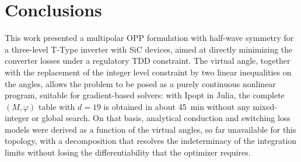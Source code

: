 \documentclass[conference]{IEEEtran}
\newcommand{\old}[1]{\par\smallskip\noindent{\color{gray}\footnotesize
    \textbf{[ANTES]} #1}\par\smallskip}
\renewcommand{\old}[1]{}       %
\begin{document}
\section{Conclusions}
This work presented a multipolar OPP formulation with half-wave symmetry for a
three-level T-Type inverter with SiC devices, aimed at directly minimizing the
converter losses under a regulatory TDD constraint. The virtual angle, together
with the replacement of the integer level constraint by two linear inequalities
on the angles, allows the problem to be posed as a purely continuous nonlinear
program, suitable for gradient-based solvers: with Ipopt in Julia, the
complete $(M,\varphi)$ table with $d=19$ is obtained in about 45~min without
any mixed-integer or global search. On that basis, analytical conduction and
switching loss models were derived as a function of the virtual angles, so far
unavailable for this topology, with a decomposition that resolves the
indeterminacy of the integration limits without losing the differentiability
that the optimizer requires.
\old{\dots\ the complete pattern set, including the 1000-point LUT, is
obtained in under 8~min \dots}
\end{document}
